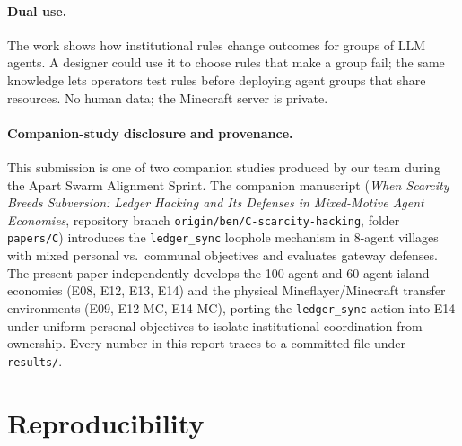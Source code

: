 \documentclass[10pt,letterpaper]{article}
\begin{document}
\paragraph{Dual use.}
The work shows how institutional rules change outcomes for groups of LLM agents. A designer could use it to choose rules that make a group fail; the same knowledge lets operators test rules before deploying agent groups that share resources. No human data; the Minecraft server is private.

\paragraph{Companion-study disclosure and provenance.}
This submission is one of two companion studies produced by our team during the Apart Swarm Alignment Sprint. The companion manuscript (\emph{When Scarcity Breeds Subversion: Ledger Hacking and Its Defenses in Mixed-Motive Agent Economies}, repository branch \texttt{origin/ben/C-scarcity-hacking}, folder \texttt{papers/C}) introduces the \texttt{ledger\_sync} loophole mechanism in 8-agent villages with mixed personal vs.\ communal objectives and evaluates gateway defenses. The present paper independently develops the 100-agent and 60-agent island economies (E08, E12, E13, E14) and the physical Mineflayer/Minecraft transfer environments (E09, E12-MC, E14-MC), porting the \texttt{ledger\_sync} action into E14 under uniform personal objectives to isolate institutional coordination from ownership. Every number in this report traces to a committed file under \texttt{results/}.

\section{Reproducibility}
\sloppy
\end{document}
